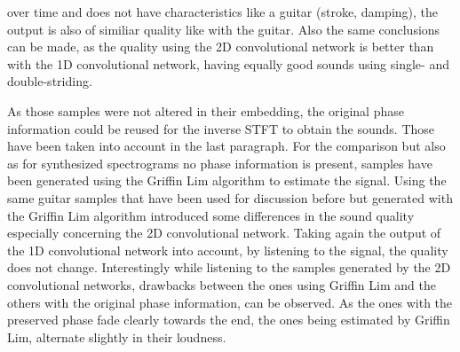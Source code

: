 over time and does not have characteristics like a guitar (stroke, damping), the output is also of similiar quality like with the guitar. Also the same conclusions can be made, as the quality using the 2D convolutional network is better than with the 1D convolutional network, having equally good sounds using single- and double-striding. 

As those samples were not altered in their embedding, the original phase information could be reused for the inverse STFT to obtain the sounds. Those have been taken into account in the last paragraph. For the comparison but also as for synthesized spectrograms no phase information is present, samples have been generated using the Griffin Lim algorithm \cite{Griffin1984} to estimate the signal. Using the same guitar samples that have been used for discussion before but generated with the Griffin Lim algorithm introduced some differences in the sound quality especially concerning the 2D convolutional network. Taking again the output of the 1D convolutional network into account, by listening to the signal, the quality does not change. Interestingly while listening to the samples generated by the 2D convolutional networks, drawbacks between the ones using Griffin Lim and the others with the original phase information, can be observed. As the ones with the preserved phase fade clearly towards the end, the ones being estimated by Griffin Lim, alternate slightly in their loudness.

